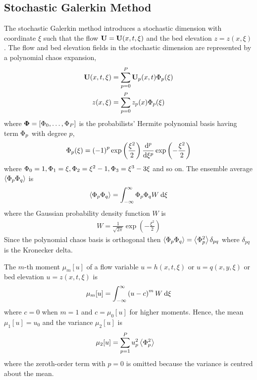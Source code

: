 \subsection{Stochastic Galerkin Method}
The stochastic Galerkin method introduces a stochastic dimension with coordinate $\xi$ such that the flow $\mathbf{U} = \mathbf{U}(x, t, \xi)$ and the bed elevation $z = z(x, \xi)$.
The flow and bed elevation fields in the stochastic dimension are represented by a polynomial chaos expansion,
\begin{subequations}
\begin{align}
    \mathbf{U}(x, t, \xi) &= \sum _{p=0}^P \mathbf{U}_p(x, t) \Phi_p(\xi) \\
    z(x, \xi) &= \sum _{p=0}^P z_p(x) \Phi_p(\xi)
\end{align}\label{eqn:pc-expansion}%
\end{subequations}
where $\bm{\Phi} = \left[ \Phi_0, \ldots, \Phi_P \right]$ is the probabilists' Hermite polynomial basis having term $\Phi_p$ with degree $p$,
\begin{align}
    \Phi_p(\xi) = \left( -1 \right)^p \exp \left(\frac{\xi^2}{2}\right)
    \frac{\mathrm{d}^p}{\mathrm{d} \xi^p} \exp \left(- \frac{\xi^2}{2} \right)
\end{align}
where $\Phi_0 = 1, \Phi_1 = \xi, \Phi_2 = \xi^2 - 1, \Phi_3 = \xi^3 - 3\xi$ and so on.
The ensemble average $\left\langle \Phi_p \Phi_q \right\rangle$ is 
\begin{align}
    \left\langle \Phi_p \Phi_q \right\rangle = \int_{-\infty}^\infty \Phi_p \Phi_q W \:\mathrm{d} \xi
\end{align}
where the Gaussian probability density function $W$ is
\begin{align}
    W = \frac{1}{\sqrt{2\pi}} \exp \left(-\frac{\xi^2}{2}\right)
\end{align}
Since the polynomial chaos basis is orthogonal then $\left\langle \Phi_p \Phi_q \right\rangle = \left\langle \Phi_p^2 \right\rangle \delta_{pq}$ where $\delta_{pq}$ is the Kronecker delta.

The $m$-th moment $\mu_m[u]$ of a flow variable $u = h(x, t, \xi)$ or $u = q(x, y, \xi)$ or bed elevation $u = z(x, t, \xi)$ is
\begin{align}
    \mu_m [u] = \int_{-\infty}^\infty \left(u - c\right)^m W \:\mathrm{d} \xi
\end{align}
where $c = 0$ when $m = 1$ and $c = \mu_0[u]$ for higher moments.
Hence, the mean $\mu_1[u] = u_0$ and the variance $\mu_2[u]$ is
\begin{align}
    \mu_2[u] &= \sum_{p=1}^P u^2_p \left\langle \Phi_p^2 \right\rangle \label{eqn:variance}
\end{align}
where the zeroth-order term with $p = 0$ is omitted because the variance is centred about the mean.

